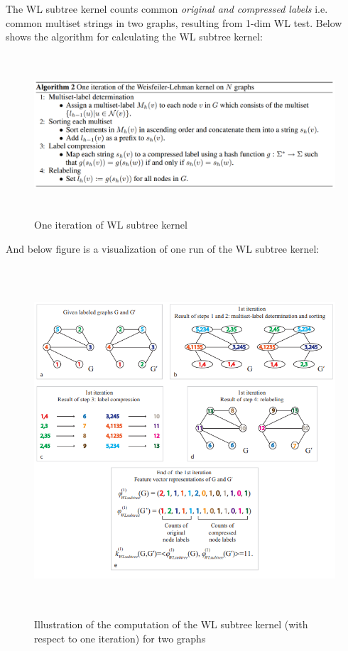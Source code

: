The WL subtree kernel counts common {\it original and compressed labels} i.e. common multiset strings in two graphs, resulting from 1-dim WL test.
Below shows the algorithm for calculating the WL subtree kernel:

\begin{figure}[hbt]
	\includegraphics[height=6cm]{preliminaries/fig/wl-kernel-alg.png}
	\caption{One iteration of WL subtree kernel}
\end{figure}

And below figure is a visualization of one run of the WL subtree kernel:

\begin{figure}[hbt!]
\centering
	\includegraphics[height=13cm]{preliminaries/fig/fig1.png}
	\caption{Illustration of the computation of the WL subtree kernel (with respect to one iteration) for two graphs}
\end{figure}

